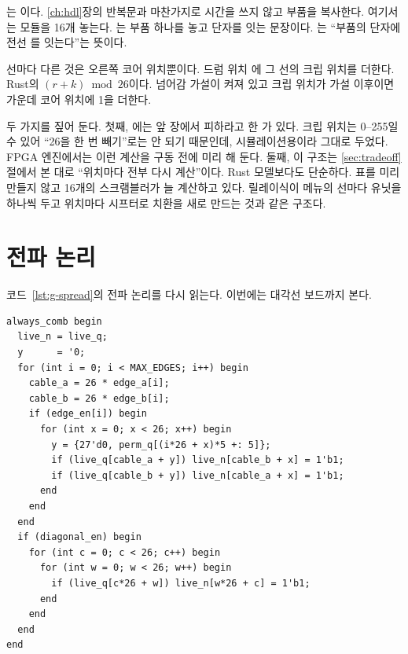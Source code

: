 는 이다. \ref{ch:hdl}장의 반복문과 마찬가지로 시간을
쓰지 않고 부품을 복사한다. 여기서는  모듈을 16개 놓는다. 는
부품 하나를 놓고 단자를 잇는 문장이다. 는 ``부품의  단자에 전선
를 잇는다''는 뜻이다.

선마다 다른 것은 오른쪽 코어 위치뿐이다. 드럼 위치 에 그 선의 크립 위치를 더한다. Rust의
$(r + k) \bmod 26$이다. 넘어감 가설이 켜져 있고 크립 위치가 가설 이후이면 가운데 코어 위치에 1을 더한다.

두 가지를 짚어 둔다. 첫째, 에는 앞 장에서 피하라고 한 \code{\%}가 있다. 크립 위치는
0--255일 수 있어 ``26을 한 번 빼기''로는 안 되기 때문인데, 시뮬레이션용이라 그대로 두었다. FPGA 엔진에서는
이런 계산을 구동 전에 미리 해 둔다. 둘째, 이 구조는 \ref{sec:tradeoff}절에서 본 대로 ``위치마다 전부 다시
계산''이다. Rust 모델보다도 단순하다. 표를 미리 만들지 않고 16개의 스크램블러가 늘 계산하고 있다.
릴레이식이 메뉴의 선마다 유닛을 하나씩 두고 위치마다 시프터로 치환을 새로 만드는 것과 같은 구조다.

\section{전파 논리}

코드~\ref{lst:g-spread}의 전파 논리를 다시 읽는다. 이번에는 대각선 보드까지 본다.

\begin{lstlisting}[language=SV,caption={\code{bombe\_core.sv}: 한 걸음 퍼뜨리기.},label={lst:spread-full}]
always_comb begin
  live_n = live_q;
  y      = '0;
  for (int i = 0; i < MAX_EDGES; i++) begin
    cable_a = 26 * edge_a[i];
    cable_b = 26 * edge_b[i];
    if (edge_en[i]) begin
      for (int x = 0; x < 26; x++) begin
        y = {27'd0, perm_q[(i*26 + x)*5 +: 5]};
        if (live_q[cable_a + y]) live_n[cable_b + x] = 1'b1;
        if (live_q[cable_b + y]) live_n[cable_a + x] = 1'b1;
      end
    end
  end
  if (diagonal_en) begin
    for (int c = 0; c < 26; c++) begin
      for (int w = 0; w < 26; w++) begin
        if (live_q[c*26 + w]) live_n[w*26 + c] = 1'b1;
      end
    end
  end
end
\end{lstlisting}

